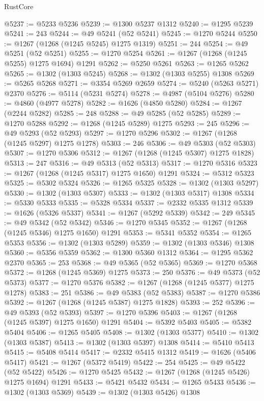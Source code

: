 \begin{lexlean}{RustCore}
\begin{coremodule}
@5237 := @5233 @5236
@5239 := @1300 @5237 @1312
@5240 := @1295 @5239
@5241 := 243
@5244 := @49 @5241 (@52 @5241)
@5245 := @1270 @5244
@5250 := @1267 (@1268 (@1245 @5245) @1275 @1319)
@5251 := 244
@5254 := @49 @5251 (@52 @5251)
@5255 := @1270 @5254
@5261 := @1267 (@1268 (@1245 @5255) @1275 @1694) @1291
@5262 := @5250 @5261
@5263 := @1265 @5262
@5265 := @1302 (@1303 @5245)
@5268 := @1302 (@1303 @5255) @1308
@5269 := @5265 @5268
@5271 := @3354 @5269 @2659
@5274 := @5240 (@5263 @5271) @2370
@5276 := @5114 (@5231 @5274)
@5278 := @4987 (@5104 @5276)
@5280 := @4860 (@4977 @5278)
@5282 := @1626 (@4850 @5280)
@5284 := @1267 (@2244 @5282)
@5285 := 248
@5288 := @49 @5285 (@52 @5285)
@5289 := @1270 @5288
@5292 := @1268 (@1245 @5289) @1275
@5293 := 245
@5296 := @49 @5293 (@52 @5293)
@5297 := @1270 @5296
@5302 := @1267 (@1268 (@1245 @5297) @1275 @1278)
@5303 := 246
@5306 := @49 @5303 (@52 @5303)
@5307 := @1270 @5306
@5312 := @1267 (@1268 (@1245 @5307) @1275 @1828)
@5313 := 247
@5316 := @49 @5313 (@52 @5313)
@5317 := @1270 @5316
@5323 := @1267 (@1268 (@1245 @5317) @1275 @1650) @1291
@5324 := @5312 @5323
@5325 := @5302 @5324
@5326 := @1265 @5325
@5328 := @1302 (@1303 @5297)
@5330 := @1302 (@1303 @5307)
@5333 := @1302 (@1303 @5317) @1308
@5334 := @5330 @5333
@5335 := @5328 @5334
@5337 := @2332 @5335 @1312
@5339 := @1626 (@5326 @5337)
@5341 := @1267 (@5292 @5339)
@5342 := 249
@5345 := @49 @5342 (@52 @5342)
@5346 := @1270 @5345
@5352 := @1267 (@1268 (@1245 @5346) @1275 @1650) @1291
@5353 := @5341 @5352
@5354 := @1265 @5353
@5356 := @1302 (@1303 @5289)
@5359 := @1302 (@1303 @5346) @1308
@5360 := @5356 @5359
@5362 := @1300 @5360 @1312
@5364 := @1295 @5362 @2370
@5365 := 253
@5368 := @49 @5365 (@52 @5365)
@5369 := @1270 @5368
@5372 := @1268 (@1245 @5369) @1275
@5373 := 250
@5376 := @49 @5373 (@52 @5373)
@5377 := @1270 @5376
@5382 := @1267 (@1268 (@1245 @5377) @1275 @1278)
@5383 := 251
@5386 := @49 @5383 (@52 @5383)
@5387 := @1270 @5386
@5392 := @1267 (@1268 (@1245 @5387) @1275 @1828)
@5393 := 252
@5396 := @49 @5393 (@52 @5393)
@5397 := @1270 @5396
@5403 := @1267 (@1268 (@1245 @5397) @1275 @1650) @1291
@5404 := @5392 @5403
@5405 := @5382 @5404
@5406 := @1265 @5405
@5408 := @1302 (@1303 @5377)
@5410 := @1302 (@1303 @5387)
@5413 := @1302 (@1303 @5397) @1308
@5414 := @5410 @5413
@5415 := @5408 @5414
@5417 := @2332 @5415 @1312
@5419 := @1626 (@5406 @5417)
@5421 := @1267 (@5372 @5419)
@5422 := 254
@5425 := @49 @5422 (@52 @5422)
@5426 := @1270 @5425
@5432 := @1267 (@1268 (@1245 @5426) @1275 @1694) @1291
@5433 := @5421 @5432
@5434 := @1265 @5433
@5436 := @1302 (@1303 @5369)
@5439 := @1302 (@1303 @5426) @1308

\end{coremodule}
\end{lexlean}
